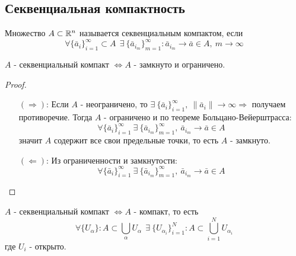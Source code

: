\subsection{Секвенциальная компактность}
\begin{definition}
    Множество $A\subset \mathbb{R}^n$ называется секвенциальным компактом, если 
    \[\forall \{\bar{a}_i\}_{i=1}^{\infty}\subset A\ \ \exists\ \{\bar{a}_{i_m}\}_{m=1}^{\infty}: \bar{a}_{i_m}\to \bar{a} \in A,\ m\to \infty\]
\end{definition}  
\begin{theorem}
    $A$ - секвенциальный компакт $\Leftrightarrow A$ - замкнуто и ограничено. 
\end{theorem}
\begin{proof}\tab
    \begin{itemize}
        \item[$(\Rightarrow)$:] Если $A$ - неограничено, то $\exists\ \{\bar{a}_i\}_{i=1}^{\infty},\ \|\bar{a}_i\|\to \infty \Rightarrow$ получаем противоречие.
        Тогда $A$ - ограничено и по теореме Больцано-Вейерштрасса:
        \[\forall \{\bar{a}_i\}_{i=1}^{\infty}\ \exists\ \{\bar{a}_{i_m}\}_{m=1}^{\infty},\ \bar{a}_{i_m} \to \bar{a}\in A\]
        значит $A$ содержит все свои предельные точки, то есть $A$ - замкнуто.
        \item[$(\Leftarrow)$:] Из ограниченности и замкнутости:
        \[\forall \{\bar{a}_i\}_{i=1}^{\infty}\ \exists\ \{\bar{a}_{i_m}\}_{m=1}^{\infty},\ \bar{a}_{i_m} \to \bar{a}\in A\]
    \end{itemize}
\end{proof} 
\begin{theorem}
    $A$ - секвенциальный компакт $\Leftrightarrow A$ - компакт, то есть
    \[\forall \{U_{\alpha}\}: A\subset \bigcup_{\alpha}U_{\alpha}\ \ \exists\ \{U_{\alpha_i}\}_{i=1}^N: A\subset \bigcup_{i=1}^N U_{\alpha_i}\]
    где $U_i$ - открыто.
\end{theorem} 
